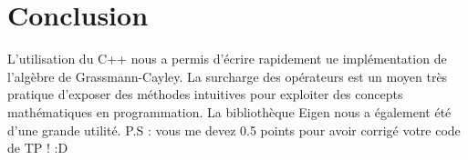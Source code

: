 \documentclass[12pt]{article}
\begin{document}


\newpage
\section{Conclusion}
L'utilisation du C++ nous a permis d'écrire rapidement ue implémentation de l'algèbre de Grassmann-Cayley. La surcharge des opérateurs est un moyen très pratique d'exposer des méthodes intuitives pour exploiter des concepts mathématiques en programmation.
La bibliothèque Eigen nous a également été d'une grande utilité.
\newline P.S : vous me devez 0.5 points pour avoir corrigé votre code de TP ! :D

\end{document}
